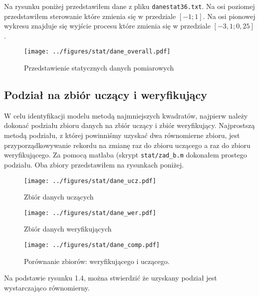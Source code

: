 \documentclass[a4paper,titlepage,11pt,floatssmall]{mwrep}
\begin{document}
\indent Na rysunku poniżej przedstawiłem dane z pliku \texttt{danestat36.txt}. Na osi poziomej przedstawiłem sterowanie które zmienia się w przedziale $[-1; 1]$. Na osi pionowej wykresu znajduje się wyjście procesu które zmienia się w przedziale $[-3,1; 0,25]$.
\bigskip
\begin{figure}[H]
\centering
\texttt{[image: ../figures/stat/dane\_overall.pdf]}
\caption{Przedstawienie statycznych danych pomiarowych}
\end{figure}


\newpage
\subsection{Podział na zbiór uczący i weryfikujący}
\indent W celu identyfikacji modelu metodą najmniejszych kwadratów, najpierw należy dokonać podziału zbioru danych na zbiór uczący i zbiór weryfikujący. Najprostszą metodą podziału, z której powinniśmy uzyskać dwa równomierne zbioru, jest przyporządkowywanie rekordu na zmianę raz do zbioru uczącego a raz do zbioru weryfikującego. Za pomocą matlaba (skrypt \texttt{stat/zad\_{}b.m} dokonałem prostego podziału. Oba zbiory przedstawiłem na rysunkach poniżej.

\begin{figure}[H]
\centering
\texttt{[image: ../figures/stat/dane\_ucz.pdf]}
\caption{Zbiór danych uczących}
\end{figure}

\begin{figure}[H]
\centering
\texttt{[image: ../figures/stat/dane\_wer.pdf]}
\caption{Zbiór danych weryfikujących}
\end{figure}

\begin{figure}[H]
\centering
\texttt{[image: ../figures/stat/dane\_comp.pdf]}
\caption{Porównanie zbiorów: weryfikującego i uczącego.}
\end{figure}

\indent Na podstawie rysunku 1.4, można stwierdzić że uzyskany podział jest wystarczająco równomierny. 
\end{document}
